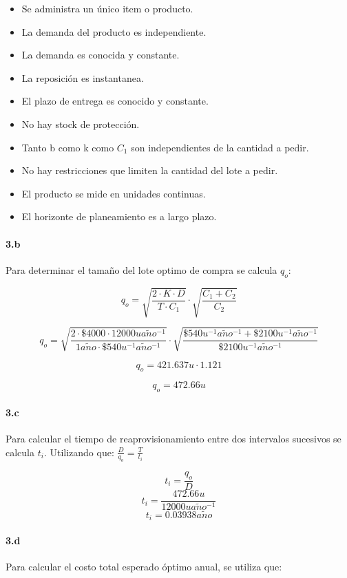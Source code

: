 \documentclass[a4paper,10pt]{article}
\def \anio {a\tilde{n}o}
\begin{document}
  \begin{itemize}
   \item Se administra un \'unico item o producto.
   \item La demanda del producto es independiente.
   \item La demanda es conocida y constante.
   \item La reposici\'on es instantanea.
   \item El plazo de entrega es conocido y constante.
   \item No hay stock de protecci\'on.
   \item Tanto b como k como $ C_1 $ son independientes de la cantidad a pedir.
   \item No hay restricciones que limiten la cantidad del lote a pedir.
   \item El producto se mide en unidades continuas.
   \item El horizonte de planeamiento es a largo plazo.
  \end{itemize}

  \paragraph{3.b}
  Para determinar el tama\~no del lote optimo de compra se calcula $ q_o $:
  
  $$ q_o = \sqrt{\frac{2 \cdot K \cdot D}{T \cdot C_1}} \cdot \sqrt{\frac{C_1 + C_2}{C_2}} $$
  
  $$q_o = \sqrt{\frac{2 \cdot \$4000  \cdot 12000 u \anio^{-1}}{1 \anio \cdot \$540 u^{-1}\anio^{-1}}} \cdot \sqrt{\frac{\$540 u^{-1}\anio^{-1} + \$2100 u^{-1}\anio^{-1}}{\$2100 u^{-1}\anio^{-1}}} $$

  $$q_o = 421.637 u \cdot 1.121 $$

  $$ \boxed{ q_o = 472.66 u } $$

  \paragraph{3.c}
  Para calcular el tiempo de reaprovisionamiento entre dos intervalos sucesivos se calcula $t_i$. Utilizando que: $ \frac{D}{q_o} = \frac{T}{t_i} $

  $$t_i = \frac{q_o}{D} $$
  $$t_i = \frac{472.66 u}{12000 u \anio^{-1}} $$
  $$\boxed{t_i = 0.03938 \anio} $$

  \paragraph{3.d}
  Para calcular el costo total esperado \'optimo anual, se utiliza que:
\end{document}
